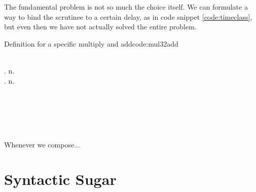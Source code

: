 The fundamental problem is not so much the choice itself.
We can formulate a way to bind the scrutinee to a certain delay, as in code snippet \ref{code:timeclass}, but even then we have not actually solved the entire problem.
\begin{texexptitled}{Definition for a specific multiply and add}{code:mul32add}
\begin{hscode}\SaveRestoreHook
{}%
%
%
%
\>[B]{}\;\;\langle{}\rangle{}\<[E]%
\\
\>[B]{}\<[5]%
\>[5]{}\<[11]%
\>[11]{}\mathbin{::}\psi. n.\;\langle{}\mathbin{+}\rangle{}\<[E]%
\\
\>[B]{}\<[5]%
\>[5]{}\mathbin{::}\psi. n.\;\langle{}\mathbin{+}\rangle{}\<[E]%
\ColumnHook
\end{hscode}\resethooks
\begin{hscode}\SaveRestoreHook
{}%
%
%
%
%
\>[B]{}\mathbin{::}\langle{}\rangle\to {}\langle{}\rangle\to {}\langle{}\rangle\mid {}\;\langle{}\rangle{}\<[E]%
\\
\>[B]{}\;\;\mathrel{=}{}\<[E]%
\\
\>[B]{}\<[5]%
\>[5]{}\;\;\<[E]%
\\
\>[5]{}\<[9]%
\>[9]{}\<[17]%
\>[17]{}\to {}\<[E]%
\\
\>[5]{}\<[9]%
\>[9]{}\<[17]%
\>[17]{}\to {}\<[E]%
\ColumnHook
\end{hscode}\resethooks
\end{texexptitled}
Whenever we compose...

\section{Syntactic Sugar}
